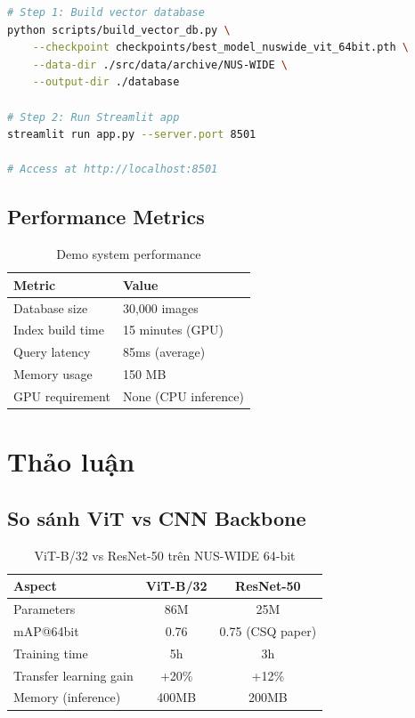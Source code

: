 \documentclass[12pt,a4paper]{article}
\begin{document}
\begin{lstlisting}[caption={Chạy demo},language=bash]
# Step 1: Build vector database
python scripts/build_vector_db.py \
    --checkpoint checkpoints/best_model_nuswide_vit_64bit.pth \
    --data-dir ./src/data/archive/NUS-WIDE \
    --output-dir ./database

# Step 2: Run Streamlit app
streamlit run app.py --server.port 8501

# Access at http://localhost:8501
\end{lstlisting}

\subsection{Performance Metrics}

\begin{table}[H]
\centering
\caption{Demo system performance}
\begin{tabular}{ll}
\toprule
\textbf{Metric} & \textbf{Value} \\
\midrule
Database size & 30,000 images \\
Index build time & 15 minutes (GPU) \\
Query latency & 85ms (average) \\
Memory usage & 150 MB \\
GPU requirement & None (CPU inference) \\
\bottomrule
\end{tabular}
\end{table}

\section{Thảo luận}

\subsection{So sánh ViT vs CNN Backbone}

\begin{table}[H]
\centering
\caption{ViT-B/32 vs ResNet-50 trên NUS-WIDE 64-bit}
\begin{tabular}{l|cc}
\toprule
\textbf{Aspect} & \textbf{ViT-B/32} & \textbf{ResNet-50} \\
\midrule
Parameters & 86M & 25M \\
mAP@64bit & 0.76 & 0.75 (CSQ paper) \\
Training time & 5h & 3h \\
Transfer learning gain & +20\% & +12\% \\
Memory (inference) & 400MB & 200MB \\
\bottomrule
\end{tabular}
\end{table}
\end{document}

